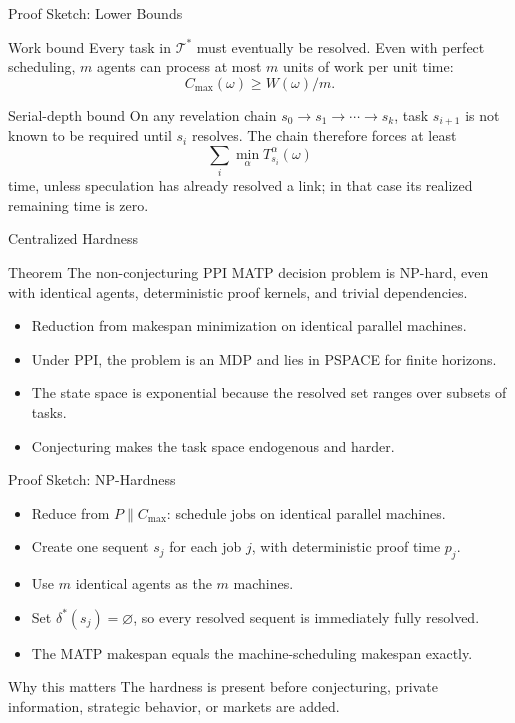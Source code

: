 \documentclass[10pt,aspectratio=169]{beamer}
\begin{document}
\begin{frame}{Proof Sketch: Lower Bounds}
\small
\begin{block}{Work bound}
Every task in $\mathcal{T}^*$ must eventually be resolved. Even with perfect scheduling, $m$ agents can process at most $m$ units of work per unit time:
\[
C_{\max}(\omega)\ge W(\omega)/m.
\]
\end{block}

\begin{block}{Serial-depth bound}
On any revelation chain $s_0\to s_1\to\cdots\to s_k$, task $s_{i+1}$ is not known to be required until $s_i$ resolves. The chain therefore forces at least
\[
\sum_i \min_\alpha T^\alpha_{s_i}(\omega)
\]
time, unless speculation has already resolved a link; in that case its realized remaining time is zero.
\end{block}
\end{frame}

\begin{frame}{Centralized Hardness}
\small
\begin{block}{Theorem}
The non-conjecturing PPI MATP decision problem is NP-hard, even with identical agents, deterministic proof kernels, and trivial dependencies.
\end{block}

\begin{itemize}
  \item Reduction from makespan minimization on identical parallel machines.
  \item Under PPI, the problem is an MDP and lies in PSPACE for finite horizons.
  \item The state space is exponential because the resolved set ranges over subsets of tasks.
  \item Conjecturing makes the task space endogenous and harder.
\end{itemize}
\end{frame}

\begin{frame}{Proof Sketch: NP-Hardness}
\small
\begin{itemize}
  \item Reduce from $P\|C_{\max}$: schedule jobs on identical parallel machines.
  \item Create one sequent $s_j$ for each job $j$, with deterministic proof time $p_j$.
  \item Use $m$ identical agents as the $m$ machines.
  \item Set $\delta^*(s_j)=\varnothing$, so every resolved sequent is immediately fully resolved.
  \item The MATP makespan equals the machine-scheduling makespan exactly.
\end{itemize}

\begin{block}{Why this matters}
The hardness is present before conjecturing, private information, strategic behavior, or markets are added.
\end{block}
\end{frame}
\end{document}
